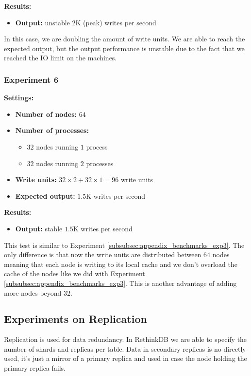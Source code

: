 \medskip
\noindent\textbf{Results:}
\begin{itemize}
 \item \textbf{Output:} unstable $2$K (peak) writes per second
\end{itemize}

In this case, we are doubling the amount of write units. 
We are able to reach the expected output, but the output performance is unstable due to the fact that we reached the IO limit on the machines. 

\subsubsection{Experiment 6}\label{subsubsec:appendix_benchmarks_exp6}
\medskip
\noindent\textbf{Settings:}
\begin{itemize}
 \item \textbf{Number of nodes:} $64$
 \item \textbf{Number of processes:}
 \begin{itemize}
  \item$32$ nodes running $1$ process
  \item$32$ nodes running $2$ processes
 \end{itemize}
 \item \textbf{Write units:} $32 \times 2 + 32 \times 1 = 96$ write units
 \item \textbf{Expected output:} $1.5$K writes per second
\end{itemize}

\medskip
\noindent\textbf{Results:}
\begin{itemize}
 \item \textbf{Output:} stable $1.5$K writes per second
\end{itemize}

This test is similar to Experiment \ref{subsubsec:appendix_benchmarks_exp3}. 
The only difference is that now the write units are distributed between $64$ nodes meaning that each node is writing to its local cache and we don't overload the cache of the nodes like we did with Experiment \ref{subsubsec:appendix_benchmarks_exp3}. 
This is another advantage of adding more nodes beyond $32$.

\subsection{Experiments on Replication}

Replication is used for data redundancy.
In RethinkDB we are able to specify the number of shards and replicas per table.
Data in secondary replicas is no directly used, it’s just a mirror of a primary replica and used in case the node holding the primary replica fails.

